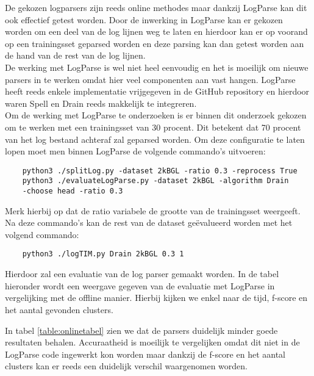 De gekozen logparsers zijn reeds online methodes maar dankzij LogParse kan dit ook effectief getest worden. Door de inwerking in LogParse kan er gekozen worden om een deel van de log lijnen weg te laten en hierdoor kan er op voorand op een trainingsset geparsed worden en deze parsing kan dan getest worden aan de hand van de rest van de log lijnen.\\

De werking met LogParse is wel niet heel eenvoudig en het is moeilijk om nieuwe parsers in te werken omdat hier veel componenten aan vast hangen. LogParse heeft reeds enkele implementatie vrijgegeven in de GitHub repository en hierdoor waren Spell en Drain reeds makkelijk te integreren.\\

Om de werking met LogParse te onderzoeken is er binnen dit onderzoek gekozen om te werken met een trainingsset van 30 procent. Dit betekent dat 70 procent van het log bestand achteraf zal geparsed worden. Om deze configuratie te laten lopen moet men binnen LogParse de volgende commando's uitvoeren:
\begin{verbatim}
    python3 ./splitLog.py -dataset 2kBGL -ratio 0.3 -reprocess True
    python3 ./evaluateLogParse.py -dataset 2kBGL -algorithm Drain
    -choose head -ratio 0.3
\end{verbatim}
Merk hierbij op dat de ratio variabele de grootte van de trainingsset weergeeft. Na deze commando's kan de rest van de dataset geëvalueerd worden met het volgend commando:
\begin{verbatim}
    python3 ./logTIM.py Drain 2kBGL 0.3 1
\end{verbatim}

Hierdoor zal een evaluatie van de log parser gemaakt worden. In de tabel hieronder wordt een weergave gegeven van de evaluatie met LogParse in vergelijking met de offline manier. Hierbij kijken we enkel naar de tijd, f-score en het aantal gevonden clusters.

In tabel \ref{table:onlinetabel} zien we dat de parsers duidelijk minder goede resultaten behalen. Accuraatheid is moeilijk te vergelijken omdat dit niet in de LogParse code ingewerkt kon worden maar dankzij de f-score en het aantal clusters kan er reeds een duidelijk verschil waargenomen worden.

